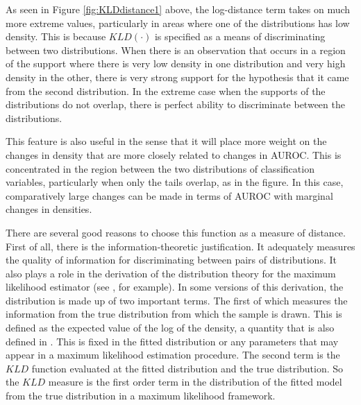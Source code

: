 

As seen in Figure \ref{fig:KLDdistance1} above, the log-distance term takes on much more extreme values, particularly in areas where one of the distributions has low density.
This is because $KLD(\cdot)$ is specified as a means of discriminating between two distributions.
When there is an observation that occurs in a region of the support where there is very low density in one distribution and very high density in the other, there is very strong support for the hypothesis that it came from the second distribution.
In the extreme case when the supports of the distributions do not overlap, there is perfect ability to discriminate between the distributions.

This feature is also useful in the sense that it will place more weight on the changes in density that are more closely related to changes in AUROC.
This is concentrated in the region between the two distributions of classification variables, particularly when only the tails overlap, as in the figure.
In this case, comparatively large changes can be made in terms of AUROC with marginal changes in densities.

There are several good reasons to choose this function as a measure of distance.
%
First of all, there is the information-theoretic justification.
It adequately measures the quality of information for discriminating between pairs of distributions.
It also plays a role in the derivation of the distribution theory for the maximum likelihood estimator (see \citet{amemiya1985}, for example).
In some versions of this derivation, the distribution is made up of two important terms.
The first of which measures the information from the true distribution from which the sample is drawn.
This is defined as the expected value of the log of the density, a quantity that is also defined in \citet{kullbackliebler1951}.
This is fixed in the fitted distribution or any parameters that may appear in a maximum likelihood estimation procedure.
The second term is the $KLD$ function evaluated at the fitted distribution and the true distribution.
So the $KLD$ measure is the first order term in the distribution of the fitted model from the true distribution in a maximum likelihood framework.


